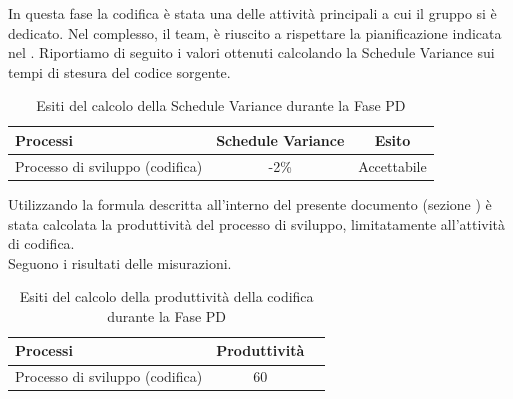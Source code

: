 			In questa fase la codifica è stata una delle attività principali a cui il gruppo si è dedicato. Nel complesso, il team, è riuscito a rispettare la pianificazione indicata nel . Riportiamo di seguito i valori ottenuti calcolando la Schedule Variance sui tempi di stesura del codice sorgente.
			\begin{table}[H]
				\centering
				\begin{tabu}{| l | c | c |}
					\hline
						Processi 						& Schedule Variance	& Esito		\\ \hline \hline
						Processo di sviluppo (codifica) & -2\% & Accettabile \\ \hline
				\end{tabu}
				\caption{Esiti del calcolo della Schedule Variance durante la Fase PD}
			\end{table}	
						
							
			Utilizzando la formula descritta all'interno del presente documento (sezione ) è stata calcolata la produttività del processo di sviluppo, limitatamente all'attività di codifica. \\
			Seguono i risultati delle misurazioni.
			\\ 
			\begin{table}[H]
				\centering
				\begin{tabu}{| l | c | c |}
					\hline
						Processi 						& Produttività		\\ \hline \hline
						Processo di sviluppo (codifica) & 60   \\ \hline
				\end{tabu}
				\caption{Esiti del calcolo della produttività della codifica durante la Fase PD}
			\end{table}	
					
